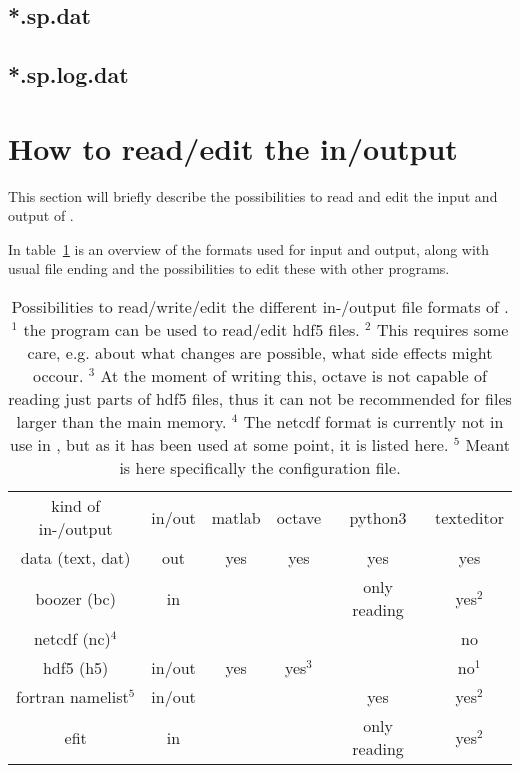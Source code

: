 \subsection{*.sp.dat}

\subsection{*.sp.log.dat}

\section{How to read/edit the in/output}
This section will briefly describe the possibilities to read and edit
the input and output of \neotwo.

In table~\ref{tablereadinginoutput} is an overview of the formats used
for input and output, along with usual file ending and the possibilities to
edit these with other programs.

\begin{table}
  \begin{center}
    \begin{tabular}{cccccc}
kind of in-/output & in/out & matlab & octave & python3 & texteditor \\
data (text, dat)   & out    & yes    & yes    & yes     & yes \\
boozer (bc)        & in     &        &        & only reading & yes$^2$ \\
netcdf (nc)$^4$    &        &        &        &         & no \\
hdf5 (h5)          & in/out & yes    & yes$^3$&         & no$^1$ \\
fortran namelist$^5$&in/out &        &        & yes     & yes$^2$ \\
efit               & in     &        &        & only reading & yes$^2$
    \end{tabular}
    \caption{Possibilities to read/write/edit the different in-/output
file formats of \neotwo.
$^1$ the program  can be used to read/edit hdf5 files.
$^2$ This requires some care, e.g. about what changes are possible, what
side effects might occour.
$^3$ At the moment of writing this, octave is not capable of reading
just parts of hdf5 files, thus it can not be recommended for files
larger than the main memory.
$^4$ The netcdf format is currently not in use in \neotwo, but as it has
been used at some point, it is listed here.
$^5$ Meant is here specifically the \neotwo configuration file.}
    \label{tablereadinginoutput}
  \end{center}
\end{table}

